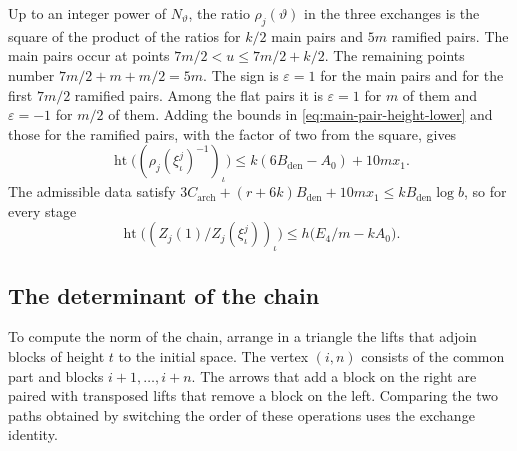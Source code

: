 Up to an integer power of \(N_\vartheta\), the ratio \(\rho_j(\vartheta)\)
in the three exchanges is the square of the product of the ratios for
\(k/2\) main pairs and \(5m\) ramified pairs. The main pairs occur at points
\(7m/2<u\le 7m/2+k/2\). The remaining points number \(7m/2+m+m/2=5m\).
The sign is \(\varepsilon=1\) for the main pairs and for the first \(7m/2\)
ramified pairs. Among the flat pairs it is \(\varepsilon=1\) for \(m\) of
them and \(\varepsilon=-1\) for \(m/2\) of them.
Adding the bounds in \eqref{eq:main-pair-height-lower} and those for the
ramified pairs, with the factor of two from the square, gives
\[
 \operatorname{ht}\bigl((\rho_j(\xi_\iota^j)^{-1})_\iota\bigr)
  \le k(6B_{\mathrm{den}}-A_0)+10mx_1.
\]
The admissible data satisfy
\(3C_{\mathrm{arch}}+(r+6k)B_{\mathrm{den}}+10mx_1
        \le kB_{\mathrm{den}}\log b\), so for every stage
\begin{equation}
 \operatorname{ht}\bigl((Z_j(1)/Z_j(\xi_\iota^j))_\iota\bigr)
   \le h\big(E_4/m-kA_0\big).
 \label{eq:single-relative-height}
\end{equation}

\subsection{The determinant of the chain}

To compute the norm of the chain, arrange in a triangle the lifts that
adjoin blocks of height \(t\) to the initial space. The vertex \((i,n)\)
consists of the common part and blocks \(i+1,\ldots,i+n\). The arrows
that add a block on the right are paired with transposed lifts that
remove a block on the left. Comparing the two paths obtained by switching
the order of these operations uses the exchange identity.



